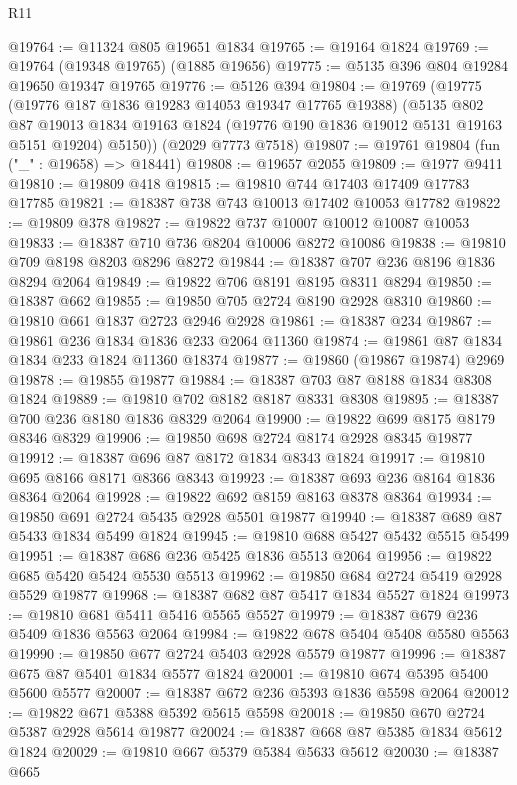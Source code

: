 \begin{lexlean}{R11}
\begin{coremodule}
@19764 := @11324 @805 @19651 @1834
@19765 := @19164 @1824
@19769 := @19764 (@19348 @19765) (@1885 @19656)
@19775 := @5135 @396 @804 @19284 @19650 @19347 @19765
@19776 := @5126 @394
@19804 := @19769
    (@19775
      (@19776 @187 @1836 @19283 @14053 @19347 @17765 @19388)
      (@5135
        @802
        @87
        @19013
        @1834
        @19163
        @1824
        (@19776 @190 @1836 @19012 @5131 @19163 @5151 @19204)
        @5150))
    (@2029 @7773 @7518)
@19807 := @19761 @19804 (fun ("_" : @19658) => @18441)
@19808 := @19657 @2055
@19809 := @1977 @9411
@19810 := @19809 @418
@19815 := @19810 @744 @17403 @17409 @17783 @17785
@19821 := @18387 @738 @743 @10013 @17402 @10053 @17782
@19822 := @19809 @378
@19827 := @19822 @737 @10007 @10012 @10087 @10053
@19833 := @18387 @710 @736 @8204 @10006 @8272 @10086
@19838 := @19810 @709 @8198 @8203 @8296 @8272
@19844 := @18387 @707 @236 @8196 @1836 @8294 @2064
@19849 := @19822 @706 @8191 @8195 @8311 @8294
@19850 := @18387 @662
@19855 := @19850 @705 @2724 @8190 @2928 @8310
@19860 := @19810 @661 @1837 @2723 @2946 @2928
@19861 := @18387 @234
@19867 := @19861 @236 @1834 @1836 @233 @2064 @11360
@19874 := @19861 @87 @1834 @1834 @233 @1824 @11360 @18374
@19877 := @19860 (@19867 @19874) @2969
@19878 := @19855 @19877
@19884 := @18387 @703 @87 @8188 @1834 @8308 @1824
@19889 := @19810 @702 @8182 @8187 @8331 @8308
@19895 := @18387 @700 @236 @8180 @1836 @8329 @2064
@19900 := @19822 @699 @8175 @8179 @8346 @8329
@19906 := @19850 @698 @2724 @8174 @2928 @8345 @19877
@19912 := @18387 @696 @87 @8172 @1834 @8343 @1824
@19917 := @19810 @695 @8166 @8171 @8366 @8343
@19923 := @18387 @693 @236 @8164 @1836 @8364 @2064
@19928 := @19822 @692 @8159 @8163 @8378 @8364
@19934 := @19850 @691 @2724 @5435 @2928 @5501 @19877
@19940 := @18387 @689 @87 @5433 @1834 @5499 @1824
@19945 := @19810 @688 @5427 @5432 @5515 @5499
@19951 := @18387 @686 @236 @5425 @1836 @5513 @2064
@19956 := @19822 @685 @5420 @5424 @5530 @5513
@19962 := @19850 @684 @2724 @5419 @2928 @5529 @19877
@19968 := @18387 @682 @87 @5417 @1834 @5527 @1824
@19973 := @19810 @681 @5411 @5416 @5565 @5527
@19979 := @18387 @679 @236 @5409 @1836 @5563 @2064
@19984 := @19822 @678 @5404 @5408 @5580 @5563
@19990 := @19850 @677 @2724 @5403 @2928 @5579 @19877
@19996 := @18387 @675 @87 @5401 @1834 @5577 @1824
@20001 := @19810 @674 @5395 @5400 @5600 @5577
@20007 := @18387 @672 @236 @5393 @1836 @5598 @2064
@20012 := @19822 @671 @5388 @5392 @5615 @5598
@20018 := @19850 @670 @2724 @5387 @2928 @5614 @19877
@20024 := @18387 @668 @87 @5385 @1834 @5612 @1824
@20029 := @19810 @667 @5379 @5384 @5633 @5612
@20030 := @18387 @665

\end{coremodule}
\end{lexlean}
